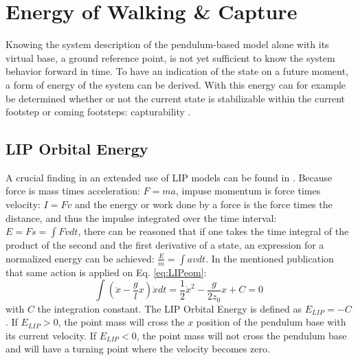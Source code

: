 \section{Energy of Walking \& Capture}\label{sec:ewalking}
Knowing the system description of the pendulum-based model alone with its virtual base, a ground reference point, is not yet sufficient to know the system behavior forward in time. To have an indication of the state on a future moment, a form of energy of the system can be derived. With this energy can for example be determined whether or not the current state is stabilizable within the current footstep or coming footsteps: capturability \cite{koolen2012capturability}. 

\subsection{LIP Orbital Energy}\label{subsec:liporbit}
A crucial finding in an extended use of \ac{LIP} models can be found in \cite{kajita1992dynamic}. Because force is mass times acceleration: $F=ma$, impuse momentum is force times velocity: $I=Fv$ and the energy or work done by a force is the force times the distance, and thus the impulse integrated over the time interval: $E = Fs = \int Fv dt$, there can be reasoned that if one takes the time integral of the product of the second and the first derivative of a state, an expression for a normalized energy can be achieved: $\frac{E}{m}=\int av dt$. In the mentioned publication that same action is applied on Eq. \eqref{eq:LIPeom}:
\begin{equation}
\int (\ddot{x}-\frac{g}{l}x)\dot{x} dt = \frac{1}{2}\dot{x}^2-\frac{g}{2z_0}x +C=0
\label{eq:Elip}
\end{equation}
with $C$ the integration constant. The \ac{LIP} Orbital Energy is defined as $E_{LIP}=-C$. If $E_{LIP}>0$, the point mass will cross the $x$ position of the pendulum base with its current velocity. If $E_{LIP}<0$, the point mass will not cross the pendulum base and will have a turning point where the velocity becomes zero.

